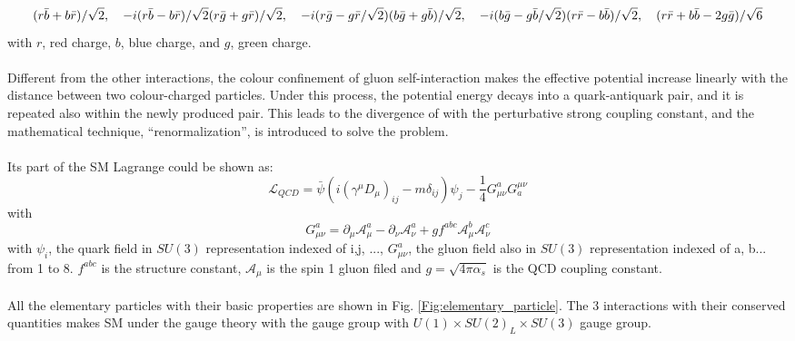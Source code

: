 \begin{equation}
         (r\bar{b}+b\bar{r})/\sqrt{2}, \quad -i(r\bar{b}-b\bar{r})/\sqrt{2}  \\
         (r\bar{g}+g\bar{r})/\sqrt{2}, \quad -i(r\bar{g}-g\bar{r}/\sqrt{2})  \\
          (b\bar{g}+g\bar{b})/\sqrt{2},\quad -i(b\bar{g}-g\bar{b}/\sqrt{2})   \\
          (r\bar{r}-b\bar{b})/\sqrt{2},\quad  (r\bar{r}+b\bar{b}-2g\bar{g})/\sqrt{6}
\end{equation}
with $r$, red charge, $b$, blue charge, and $g$, green charge.
\\
\\Different from the other interactions, the colour confinement of gluon self-interaction makes the effective potential increase linearly with the distance between two colour-charged particles. Under this process, the potential energy decays into a quark-antiquark pair, and it is repeated also within the newly produced pair. This leads to the divergence of with the perturbative strong coupling constant, and the mathematical technique, ``renormalization'', is introduced to solve the problem. 
\\
\\Its part of the SM Lagrange could be shown as:
\begin{equation}
\mathcal{L}_{QCD}=\bar{\psi}(i(\gamma^\mu D_\mu)_{ij}-m\delta_{ij})\psi_j-\frac{1}{4}G^a_{\mu\nu}G_a^{\mu\nu} 
\end{equation}
with
\begin{equation}
G^a_{\mu\nu}=\partial_\mu\mathcal{A}^a_\mu-\partial_\nu\mathcal{A}^a_\nu+gf^{abc}\mathcal{A}^b_\mu\mathcal{A}^c_\nu 
\end{equation}
with $\psi_i$, the quark field in $SU(3)$ representation indexed of i,j, ..., $G^a_{\mu\nu}$, the gluon field also in $SU(3)$ representation indexed of a, b... from 1 to 8. $f^{abc}$ is the structure constant, $\mathcal{A}_\mu$ is the spin 1 gluon filed and $g = \sqrt{4\pi\alpha_s}$ is the QCD coupling constant.
\\
\\All the elementary particles with their basic properties are shown in Fig. \ref{Fig:elementary_particle}. The 3 interactions with their conserved quantities makes SM under the gauge theory with the gauge group with $U(1) \times SU(2)_L \times SU(3)$ gauge group.

